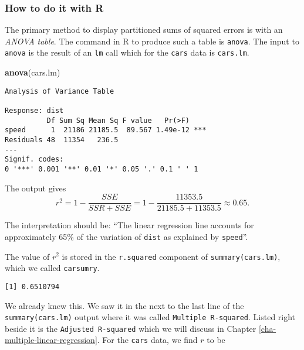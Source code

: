 \documentclass[]{book}
\newenvironment{Shaded}{\begin{snugshade}}{\end{snugshade}}
\newcommand{\KeywordTok}[1]{\textcolor[rgb]{0.13,0.29,0.53}{\textbf{{#1}}}}
\newcommand{\NormalTok}[1]{{#1}}
\numberwithin{equation}{chapter}
\numberwithin{figure}{chapter}
\theoremstyle{plain}
\theoremstyle{definition}
\theoremstyle{remark}
\theoremstyle{definition}
\theoremstyle{definition}
\theoremstyle{remark}
\begin{document}
\subsubsection{How to do it with R}\label{how-to-do-it-with-r-53}

The primary method to display partitioned sums of squared errors is with
an \emph{ANOVA table}. The command in R to produce such a table is
\texttt{anova}. The input to \texttt{anova} is the result of an
\texttt{lm} call which for the \texttt{cars} data is \texttt{cars.lm}.

\begin{Shaded}
\begin{Highlighting}[]
\KeywordTok{anova}\NormalTok{(cars.lm)}
\end{Highlighting}
\end{Shaded}

\begin{verbatim}
Analysis of Variance Table

Response: dist
          Df Sum Sq Mean Sq F value   Pr(>F)    
speed      1  21186 21185.5  89.567 1.49e-12 ***
Residuals 48  11354   236.5                     
---
Signif. codes:  
0 '***' 0.001 '**' 0.01 '*' 0.05 '.' 0.1 ' ' 1
\end{verbatim}

The output gives \[
r^{2}=1-\frac{SSE}{SSR+SSE}=1-\frac{11353.5}{21185.5+11353.5}\approx0.65.
\]

The interpretation should be: ``The linear regression line accounts for
approximately 65\% of the variation of \texttt{dist} as explained by
\texttt{speed}''.

The value of \(r^{2}\) is stored in the \texttt{r.squared} component of
\texttt{summary(cars.lm)}, which we called \texttt{carsumry}.

\begin{Shaded}
\end{Shaded}

\begin{verbatim}
[1] 0.6510794
\end{verbatim}

We already knew this. We saw it in the next to the last line of the
\texttt{summary(cars.lm)} output where it was called
\texttt{Multiple\ R-squared}. Listed right beside it is the
\texttt{Adjusted\ R-squared} which we will discuss in Chapter
\ref{cha-multiple-linear-regression}. For the \texttt{cars} data, we
find \(r\) to be
\end{document}
